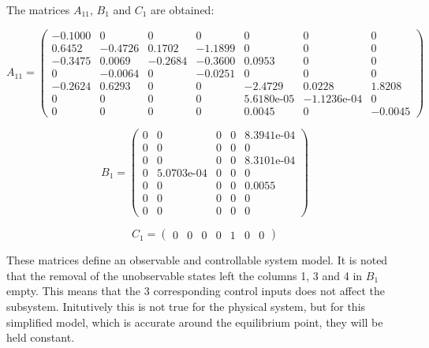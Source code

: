 The matrices $A_{11}$, $B_{1}$ and $C_{1}$ are obtained:

\begin{equation}  \label{eq:A11}
	A_{11} = \left(\begin{array}{ccccccc}
		-0.1000 & 0 & 0 & 0 & 0 & 0 & 0\\
		0.6452 & -0.4726 & 0.1702 & -1.1899 & 0 & 0 & 0\\
		-0.3475 & 0.0069 & -0.2684 & -0.3600 & 0.0953 & 0 & 0\\
		0 & -0.0064 & 0 & -0.0251 & 0 & 0 & 0\\
		-0.2624 & 0.6293 & 0 & 0 & -2.4729 & 0.0228 & 1.8208\\
		0 & 0 & 0 & 0 & \text{5.6180e-05} & -\text{1.1236e-04} & 0\\
		0 & 0 & 0 & 0 & 0.0045 & 0 & -0.0045
	\end{array}\right)
\end{equation}

\begin{equation}  \label{eq:B1}
	B_1 = \left(\begin{array}{ccccc}
		0 & 0 & 0 & 0 & \text{8.3941e-04}\\
		0 & 0 & 0 & 0 & 0\\
		0 & 0 & 0 & 0 & \text{8.3101e-04}\\
		0 & \text{5.0703e-04} & 0 & 0 & 0\\
		0 & 0 & 0 & 0 & 0.0055\\
		0 & 0 & 0 & 0 & 0\\
		0 & 0 & 0 & 0 & 0
	\end{array}\right)
\end{equation}


\begin{equation}  \label{eq:C1}
	C_1 =\left(\begin{array}{ccccccc}
		0 & 0 & 0 & 0 & 1 & 0 & 0
	\end{array}\right)
\end{equation}

These matrices define an observable and controllable system model. It is noted that the removal of the unobservable states left the columns 1, 3 and 4 in $B_1$ empty. This means that the 3 corresponding control inputs does not affect the subsystem. Initutively this is not true for the physical system, but for this simplified model, which is accurate around the equilibrium point, they will be held constant. 